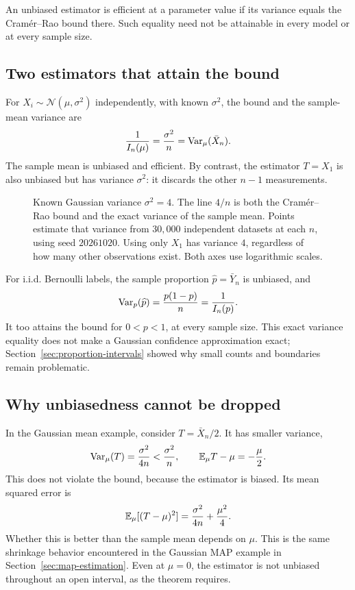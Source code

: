 \begin{definition}
An unbiased estimator is efficient at a parameter value if its variance
equals the Cramér--Rao bound there. Such equality need not be attainable
in every model or at every sample size.
\end{definition}

\subsection{Two estimators that attain the bound}

For \(X_i\sim\mathcal N(\mu,\sigma^2)\) independently, with known
\(\sigma^2\), the bound and the sample-mean variance are
\[
  \frac1{I_n(\mu)}=\frac{\sigma^2}{n}
                 =\operatorname{Var}_\mu(\bar X_n).
\]
The sample mean is unbiased and efficient. By contrast, the estimator
\(T=X_1\) is also unbiased but has variance \(\sigma^2\): it discards
the other \(n-1\) measurements.

\begin{figure}[H]
  \centering\InfoVariancePlot
  \caption{Known Gaussian variance \(\sigma^2=4\). The line \(4/n\)
  is both the Cramér--Rao bound and the exact variance of the sample
  mean. Points estimate that variance from \(30{,}000\) independent
  datasets at each \(n\), using seed \(20261020\). Using only \(X_1\)
  has variance \(4\), regardless of how many other observations exist.
  Both axes use logarithmic scales.}
  \label{fig:information-variance}
\end{figure}

For i.i.d. Bernoulli labels, the sample proportion
\(\widehat p=\bar Y_n\) is unbiased, and
\[
  \operatorname{Var}_p(\widehat p)=\frac{p(1-p)}n=\frac1{I_n(p)}.
\]
It too attains the bound for \(0<p<1\), at every sample size.
This exact variance equality does not make a Gaussian confidence
approximation exact; Section~\ref{sec:proportion-intervals} showed why
small counts and boundaries remain problematic.

\subsection{Why unbiasedness cannot be dropped}

In the Gaussian mean example, consider \(T=\bar X_n/2\).
It has smaller variance,
\[
  \operatorname{Var}_\mu(T)=\frac{\sigma^2}{4n}
             <\frac{\sigma^2}{n},
  \qquad
  \mathbb{E}_\mu T-\mu=-\frac\mu2.
\]
This does not violate the bound, because the estimator is biased.
Its mean squared error is
\[
  \mathbb{E}_\mu[(T-\mu)^2]=\frac{\sigma^2}{4n}+\frac{\mu^2}{4}.
\]
Whether this is better than the sample mean depends on \(\mu\).
This is the same shrinkage behavior encountered in the Gaussian MAP
example in Section~\ref{sec:map-estimation}. Even at \(\mu=0\), the
estimator is not unbiased throughout an open interval, as the theorem
requires.


